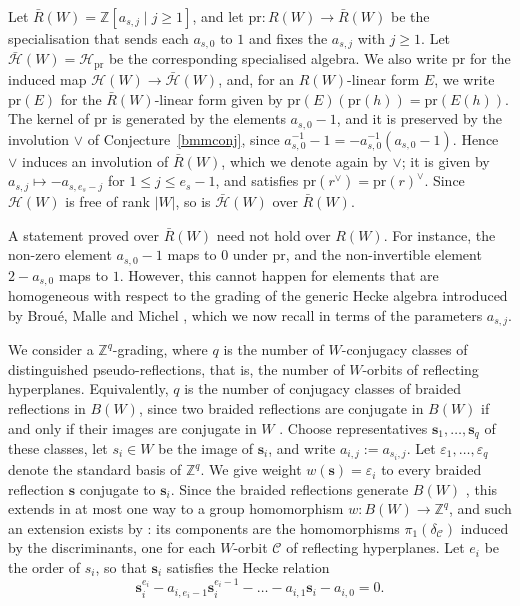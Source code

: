 \documentclass[11pt, reqno]{amsart}
\numberwithin{equation}{section}
\theoremstyle{remark}
\begin{document}
Let $\bar R(W)=\mathbb Z[a_{s,j}\mid j\ge1]$, and let
$\mathrm{pr}\colon R(W)\to\bar R(W)$ be the specialisation that sends
each $a_{s,0}$ to $1$ and fixes the $a_{s,j}$ with $j\ge1$. Let
$\bar{\mathcal H}(W)=\mathcal H_{\mathrm{pr}}$ be the corresponding
specialised algebra. We also write $\mathrm{pr}$ for the induced map
$\mathcal H(W)\to\bar{\mathcal H}(W)$, and, for an $R(W)$-linear form
$E$, we write $\mathrm{pr}(E)$ for the $\bar R(W)$-linear form given by
$\mathrm{pr}(E)(\mathrm{pr}(h))=\mathrm{pr}(E(h))$. The kernel of
$\mathrm{pr}$ is generated by the elements $a_{s,0}-1$, and it is
preserved by the involution $\vee$ of Conjecture~\ref{bmmconj}, since
$a_{s,0}^{-1}-1=-a_{s,0}^{-1}(a_{s,0}-1)$. Hence $\vee$ induces an
involution of $\bar R(W)$, which we denote again by $\vee$; it is given
by $a_{s,j}\mapsto -a_{s,e_s-j}$ for $1\le j\le e_s-1$, and satisfies
$\mathrm{pr}(r^\vee)=\mathrm{pr}(r)^\vee$. Since $\mathcal H(W)$ is free
of rank $|W|$, so is $\bar{\mathcal H}(W)$ over $\bar R(W)$.

	

A statement proved over $\bar R(W)$ need not hold over $R(W)$. For
instance, the non-zero element $a_{s,0}-1$ maps to $0$ under
$\mathrm{pr}$, and the non-invertible element $2-a_{s,0}$ maps to $1$.
However, this cannot happen for elements that are homogeneous with
respect to the grading of the generic Hecke algebra introduced by
Brou\'e, Malle and Michel \cite[\S1C]{BMM}, which we now recall in
terms of the parameters $a_{s,j}$.

We consider a $\mathbb Z^q$-grading, where $q$ is the number of $W$-conjugacy classes of distinguished pseudo-reflections, that is, the number of $W$-orbits of reflecting hyperplanes. Equivalently, $q$ is the number of conjugacy classes of braided reflections in $B(W)$, since two braided reflections are conjugate in $B(W)$ if and only if their images are conjugate in $W$ \cite[Lemma~2.14 and Theorem~2.17]{BMR}. Choose representatives $\mathbf s_1,\dots,\mathbf s_q$ of these classes, let $s_i\in W$ be the image of $\mathbf s_i$, and write $a_{i,j}:=a_{s_i,j}$. Let $\varepsilon_1,\dots,\varepsilon_q$ denote the standard basis of $\mathbb Z^q$. We give weight $w(\mathbf s)=\varepsilon_i$ to every braided reflection
$\mathbf s$ conjugate to $\mathbf s_i$. Since the braided reflections
generate $B(W)$ \cite[Theorem~2.17(1)]{BMR}, this extends in at most one way
to a group homomorphism $w\colon B(W)\to\mathbb Z^q$, and such an
extension exists by \cite[Proposition~2.16]{BMR}: its components are the
homomorphisms $\pi_1(\delta_{\mathcal C})$ induced by the
discriminants, one for each $W$-orbit $\mathcal C$ of reflecting
hyperplanes. Let $e_i$ be the order of $s_i$, so that $\mathbf s_i$ satisfies the
Hecke relation
\[
\mathbf s_i^{e_i}-a_{i,e_i-1}\mathbf s_i^{e_i-1}-\dots
-a_{i,1}\mathbf s_i-a_{i,0}=0.
\]
\end{document}

